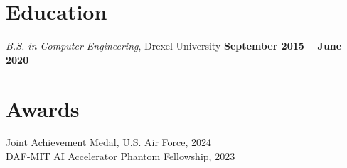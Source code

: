 \documentclass[margin,line]{resume}
\begin{document}
\begin{resume}
    \section{\mysidestyle Education}

    \textsl{B.S. in Computer Engineering}, Drexel University \hfill \textbf{ September 2015 -- June 2020}\vspace{-3mm}\\\vspace{-1mm}%


    \section{\mysidestyle Awards}
    Joint Achievement Medal, U.S. Air Force, 2024\vspace{1mm}\\%
    DAF-MIT AI Accelerator Phantom Fellowship, 2023\vspace{1mm}





\end{resume}
\end{document}
